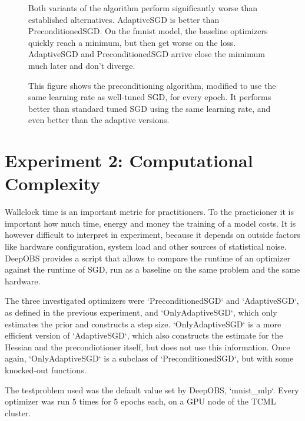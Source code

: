 \documentclass[twoside,12pt,a4paper]{report}
\begin{document}
\begin{figure}
		
		\caption{Both variants of the algorithm perform significantly worse than established alternatives. AdaptiveSGD is better than PreconditionedSGD. On the fmnist model, the baseline optimizers quickly reach a minimum, but then get worse on the loss. AdaptiveSGD and PreconditionedSGD arrive close the mimimum much later and don't diverge.}
		\label{fig:exp_preconditioning}
\end{figure}

\begin{figure}
		
		\caption{This figure shows the preconditioning algorithm, modified to use the same learning rate as well-tuned SGD, for every epoch. It performs better than standard tuned SGD using the same learning rate, and even better than the adaptive versions.}
		\label{fig:exp_tunedalpha}
\end{figure}

\section{Experiment 2: Computational Complexity}
\begin{markdown}
Wallclock time is an important metric for practitioners. To the practicioner it is important how much time, energy and money the training of a model costs. It is however difficult to interpret in experiment, because it depends on outside factors like hardware configuration, system load and other sources of statistical noise. DeepOBS provides a script that allows to compare the runtime of an optimizer against the runtime of SGD, run as a baseline on the same problem and the same hardware.

The three investigated optimizers were `PreconditionedSGD` and `AdaptiveSGD`, as defined in the previous experiment, and `OnlyAdaptiveSGD`, which only estimates the prior and constructs a step size. `OnlyAdaptiveSGD` is a more efficient version of `AdaptiveSGD`, which also constructs the estimate for the Hessian and the precondiotioner itself, but does not use this information. Once again, `OnlyAdaptiveSGD` is a subclass of `PreconditionedSGD`, but with some knocked-out functions.

The testproblem used was the default value set by DeepOBS, `mnist_mlp`. Every optimizer was run 5 times for 5 epochs each, on a GPU node of the TCML cluster.
\end{markdown}
\end{document}
